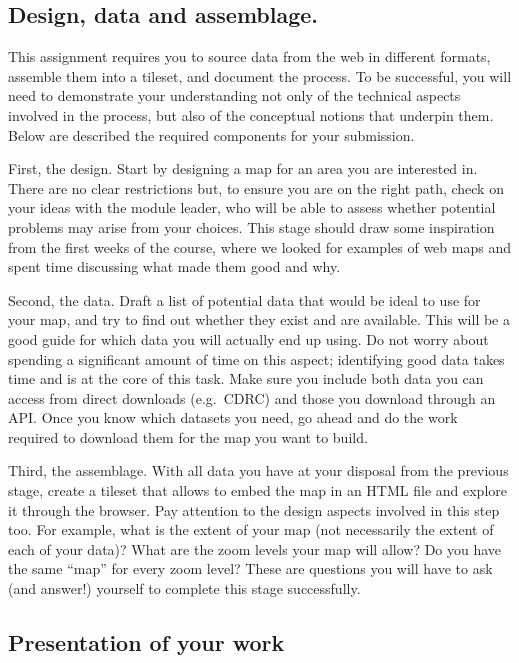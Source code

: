 \documentclass[
  letterpaper,
  DIV=11,
  numbers=noendperiod]{scrreprt}
\begin{document}
\subsection*{Design, data and
assemblage.}\label{design-data-and-assemblage.}

This assignment requires you to source data from the web in different
formats, assemble them into a tileset, and document the process. To be
successful, you will need to demonstrate your understanding not only of
the technical aspects involved in the process, but also of the
conceptual notions that underpin them. Below are described the required
components for your submission.

First, the design. Start by designing a map for an area you are
interested in. There are no clear restrictions but, to ensure you are on
the right path, check on your ideas with the module leader, who will be
able to assess whether potential problems may arise from your choices.
This stage should draw some inspiration from the first weeks of the
course, where we looked for examples of web maps and spent time
discussing what made them good and why.

Second, the data. Draft a list of potential data that would be ideal to
use for your map, and try to find out whether they exist and are
available. This will be a good guide for which data you will actually
end up using. Do not worry about spending a significant amount of time
on this aspect; identifying good data takes time and is at the core of
this task. Make sure you include both data you can access from direct
downloads (e.g.~CDRC) and those you download through an API. Once you
know which datasets you need, go ahead and do the work required to
download them for the map you want to build.

Third, the assemblage. With all data you have at your disposal from the
previous stage, create a tileset that allows to embed the map in an HTML
file and explore it through the browser. Pay attention to the design
aspects involved in this step too. For example, what is the extent of
your map (not necessarily the extent of each of your data)? What are the
zoom levels your map will allow? Do you have the same ``map'' for every
zoom level? These are questions you will have to ask (and answer!)
yourself to complete this stage successfully.

\subsection*{Presentation of your work}\label{presentation-of-your-work}
\end{document}
